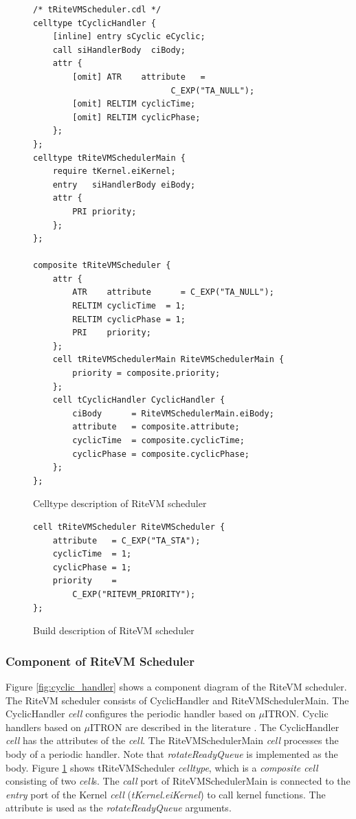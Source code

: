 \documentclass[S,R,E]{article/compsoft}
\begin{document}
\begin{figure}[t]
    \centering
    \begin{lstlisting}
/* tRiteVMScheduler.cdl */
celltype tCyclicHandler {
    [inline] entry sCyclic eCyclic;
    call siHandlerBody  ciBody;
    attr {
        [omit] ATR    attribute   =
                            C_EXP("TA_NULL");
    	[omit] RELTIM cyclicTime;
    	[omit] RELTIM cyclicPhase;
    };
};
celltype tRiteVMSchedulerMain {
    require tKernel.eiKernel;
    entry   siHandlerBody eiBody;
    attr {
        PRI priority;
    };
};

composite tRiteVMScheduler {
    attr {
        ATR    attribute      = C_EXP("TA_NULL");
        RELTIM cyclicTime  = 1;
        RELTIM cyclicPhase = 1;
        PRI    priority;
    };
    cell tRiteVMSchedulerMain RiteVMSchedulerMain {
        priority = composite.priority;
    };
    cell tCyclicHandler CyclicHandler {
        ciBody      = RiteVMSchedulerMain.eiBody;
        attribute   = composite.attribute;
        cyclicTime  = composite.cyclicTime;
        cyclicPhase = composite.cyclicPhase;
    };
};
    \end{lstlisting}
\caption{Celltype description of RiteVM scheduler}
\label{celltype_cyclic_handler}
\end{figure}
\begin{figure}[t]
    \centering
    \begin{lstlisting}
cell tRiteVMScheduler RiteVMScheduler {
    attribute   = C_EXP("TA_STA");
    cyclicTime  = 1;
    cyclicPhase = 1;
    priority    =
        C_EXP("RITEVM_PRIORITY");
};
\end{lstlisting}
\caption{Build description of RiteVM scheduler}
\label{build_cyclic_handler}
\end{figure}

\subsubsection{Component of RiteVM Scheduler}

Figure \ref{fig:cyclic_handler} shows a component diagram of the RiteVM scheduler.
The RiteVM scheduler consists of CyclicHandler and RiteVMSchedulerMain.
The CyclicHandler {\it cell} configures the periodic handler based on $\mu$ITRON.
Cyclic handlers based on $\mu$ITRON are described in the literature \cite{par:microITRON}.
The CyclicHandler {\it cell} has the attributes of the {\it cell}.
The RiteVMSchedulerMain {\it cell} processes the body of a periodic handler.
Note that {\it rotateReadyQueue} is implemented as the body.
Figure \ref{celltype_cyclic_handler} shows tRiteVMScheduler {\it celltype}, which is a {\it composite cell} consisting of two {\it cell}s.
The {\it call} port of RiteVMSchedulerMain is connected to the {\it entry} port of the Kernel {\it cell} ({\it tKernel.eiKernel}) to call kernel functions.
The attribute is used as the {\it rotateReadyQueue} arguments.
\end{document}
